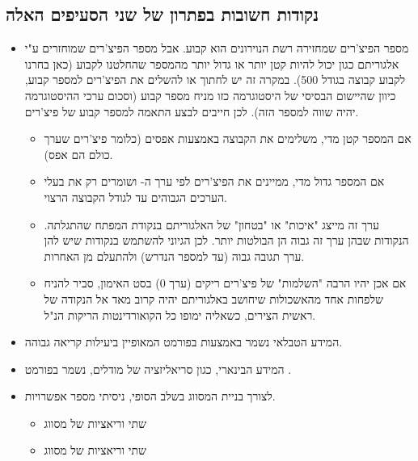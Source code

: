 \subsection*{נקודות חשובות בפתרון של שני הסעיפים האלה}
\begin{itemize}
    \item מספר הפיצ'רים שמחזירה רשת הנוירונים הוא קבוע. אבל מספר הפיצ'רים שמוחזרים ע"י אלגוריתם כגון  יכול להיות קטן יותר או גדול יותר מהמספר שהחלטנו לקבוע (כאן בחרנו לקבוע קבוצה בגודל 500).\newline
    במקרה זה יש לחתוך או להשלים את הפיצ'רים למספר קבוע, כיוון שהיישום הבסיסי של היסטוגרמה כזו מניח מספר קבוע (וסכום ערכי ההיסטוגרמה יהיה שווה למספר הזה). \newline
    לכן חייבים לבצע התאמה למספר קבוע של פיצ'רים.
    \begin{itemize}
    \item  
אם המספר קטן מדי, משלימים את הקבוצה באמצעות אפסים (כלומר פיצ'רים שערך כולם הם אפס).
\item אם המספר גדול מדי, ממיינים את הפיצ'רים לפי ערך ה-  ושומרים רק את בעלי הערכים הגבוהים עד לגודל הקבוצה הרצוי.
\item ערך זה מייצג "איכות" או "בטחון" של האלגוריתם בנקודת המפתח שהתגלתה. הנקודות שבהן ערך זה גבוה הן הבולטות יותר. לכן הגיוני להשתמש בנקודות שיש להן ערך תגובה גבוה (עד למספר הנדרש) ולהתעלם מן האחרות.
\item אם אכן יהיו הרבה "השלמות" של פיצ'רים ריקים (ערך 0) בסט האימון, סביר להניח שלפחות אחד מהאשכולות שיחושב באלגוריתם  יהיה קרוב מאד אל הנקודה של ראשית הצירים, כשאליה ימופו כל הקואורדינטות הריקות הנ"ל.
    \end{itemize}
\item המידע הטבלאי נשמר באמצעות  בפורמט  המאופיין ביעילות קריאה גבוהה. 
\item המידע הבינארי, כגון סריאליזציה של מודלים, נשמר בפורמט .
\item לצורך בניית המסווג בשלב הסופי, ניסיתי מספר אפשרויות.
    \begin{itemize}
        \item שתי וריאציות של מסווג 
        \item שתי וריאציות של מסווג 
    \end{itemize}
\end{itemize}

